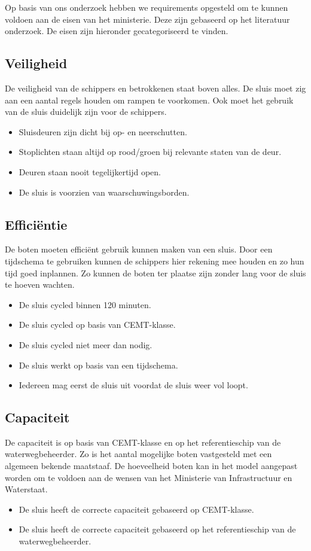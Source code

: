 \documentclass[../verslag.tex]{subfiles}
\begin{document}
Op basis van ons onderzoek hebben we requirements opgesteld om te kunnen voldoen aan de eisen van het ministerie. Deze zijn gebaseerd op het literatuur onderzoek. De eisen zijn hieronder gecategoriseerd te vinden.

\subsection{Veiligheid}
De veiligheid van de schippers en betrokkenen staat boven alles. De sluis moet zig aan een aantal regels houden om rampen te voorkomen. Ook moet het gebruik van de sluis duidelijk zijn voor de schippers.
\begin{itemize}
    \item Sluisdeuren zijn dicht bij op- en neerschutten.
    \item Stoplichten staan altijd op rood/groen bij relevante staten van de deur.
    \item Deuren staan nooit tegelijkertijd open.
    \item De sluis is voorzien van waarschuwingsborden.
\end{itemize}

\subsection{Efficiëntie}
De boten moeten efficiënt gebruik kunnen maken van een sluis. Door een tijdschema te gebruiken kunnen de schippers hier rekening mee houden en zo hun tijd goed inplannen. Zo kunnen de boten ter plaatse zijn zonder lang voor de sluis te hoeven wachten.
\begin{itemize}
    \item De sluis cycled binnen 120 minuten.
    \item De sluis cycled op basis van CEMT-klasse.
    \item De sluis cycled niet meer dan nodig.
    \item De sluis werkt op basis van een tijdschema.
    \item Iedereen mag eerst de sluis uit voordat de sluis weer vol loopt.
\end{itemize}

\subsection{Capaciteit}
De capaciteit is op basis van CEMT-klasse en op het referentieschip van de waterwegbeheerder. Zo is het aantal mogelijke boten vastgesteld met een algemeen bekende maatstaaf. De hoeveelheid boten kan in het model aangepast worden om te voldoen aan de wensen van het Ministerie van Infrastructuur en Waterstaat.
\begin{itemize}
    \item De sluis heeft de correcte capaciteit gebaseerd op CEMT-klasse.
    \item De sluis heeft de correcte capaciteit gebaseerd op het referentieschip van de waterwegbeheerder.
\end{itemize}
\end{document}
